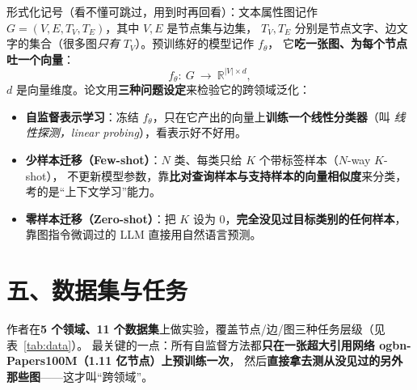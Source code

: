 \documentclass[11pt,UTF8,fontset=fandol]{ctexart}
\begin{document}
形式化记号（看不懂可跳过，用到时再回看）：文本属性图记作 $G=(V,E,T_V,T_E)$，其中 $V,E$ 是节点集与边集，
$T_V,T_E$ 分别是节点文字、边文字的集合（很多图\emph{只有} $T_V$）。预训练好的模型记作 $f_\theta$，
它\textbf{吃一张图、为每个节点吐一个向量}：
\begin{equation*}
  f_\theta:\ G\ \longrightarrow\ \mathbb{R}^{|V|\times d}, \tag{记号}
\end{equation*}
$d$ 是向量维度。论文用\textbf{三种问题设定}来检验它的跨领域泛化：

\begin{itemize}[leftmargin=2em]
  \item \textbf{自监督表示学习}：冻结 $f_\theta$，只在它产出的向量上\textbf{训练一个线性分类器}（叫
        \emph{线性探测，linear probing}），看表示好不好用。
  \item \textbf{少样本迁移（Few-shot）}：$N$ 类、每类只给 $K$ 个带标签样本（$N$-way $K$-shot），
        不更新模型参数，靠\textbf{比对查询样本与支持样本的向量相似度}来分类，考的是“上下文学习”能力。
  \item \textbf{零样本迁移（Zero-shot）}：把 $K$ 设为 0，\textbf{完全没见过目标类别的任何样本}，
        靠图指令微调过的 LLM 直接用自然语言预测。
\end{itemize}

\section{五、数据集与任务}

作者在\textbf{5 个领域、11 个数据集}上做实验，覆盖节点/边/图三种任务层级（见表~\ref{tab:data}）。
最关键的一点：所有自监督方法都\textbf{只在一张超大引用网络 ogbn-Papers100M（1.11 亿节点）上预训练一次}，
然后\textbf{直接拿去测从没见过的另外那些图}——这才叫“跨领域”。
\end{document}
